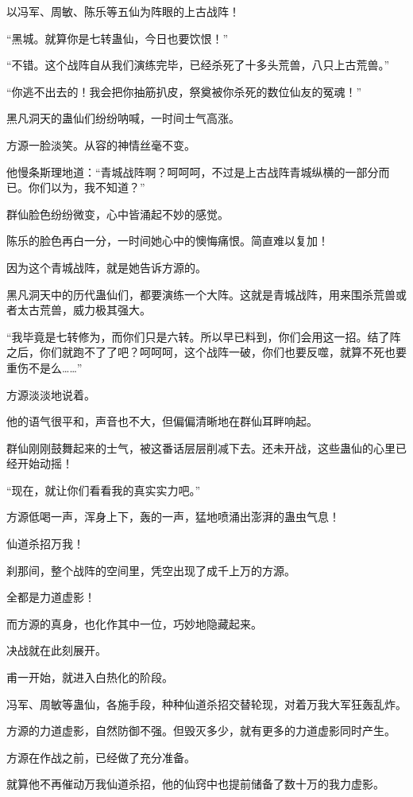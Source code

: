 \begin{this_body}
以冯军、周敏、陈乐等五仙为阵眼的上古战阵！

“黑城。就算你是七转蛊仙，今日也要饮恨！”

“不错。这个战阵自从我们演练完毕，已经杀死了十多头荒兽，八只上古荒兽。”

“你逃不出去的！我会把你抽筋扒皮，祭奠被你杀死的数位仙友的冤魂！”

黑凡洞天的蛊仙们纷纷呐喊，一时间士气高涨。

方源一脸淡笑。从容的神情丝毫不变。

他慢条斯理地道：“青城战阵啊？呵呵呵，不过是上古战阵青城纵横的一部分而已。你们以为，我不知道？”

群仙脸色纷纷微变，心中皆涌起不妙的感觉。

陈乐的脸色再白一分，一时间她心中的懊悔痛恨。简直难以复加！

因为这个青城战阵，就是她告诉方源的。

黑凡洞天中的历代蛊仙们，都要演练一个大阵。这就是青城战阵，用来围杀荒兽或者太古荒兽，威力极其强大。

“我毕竟是七转修为，而你们只是六转。所以早已料到，你们会用这一招。结了阵之后，你们就跑不了了吧？呵呵呵，这个战阵一破，你们也要反噬，就算不死也要重伤不是么……”

方源淡淡地说着。

他的语气很平和，声音也不大，但偏偏清晰地在群仙耳畔响起。

群仙刚刚鼓舞起来的士气，被这番话层层削减下去。还未开战，这些蛊仙的心里已经开始动摇！

“现在，就让你们看看我的真实实力吧。”

方源低喝一声，浑身上下，轰的一声，猛地喷涌出澎湃的蛊虫气息！

仙道杀招万我！

刹那间，整个战阵的空间里，凭空出现了成千上万的方源。

全都是力道虚影！

而方源的真身，也化作其中一位，巧妙地隐藏起来。

决战就在此刻展开。

甫一开始，就进入白热化的阶段。

冯军、周敏等蛊仙，各施手段，种种仙道杀招交替轮现，对着万我大军狂轰乱炸。

方源的力道虚影，自然防御不强。但毁灭多少，就有更多的力道虚影同时产生。

方源在作战之前，已经做了充分准备。

就算他不再催动万我仙道杀招，他的仙窍中也提前储备了数十万的我力虚影。


\end{this_body}
